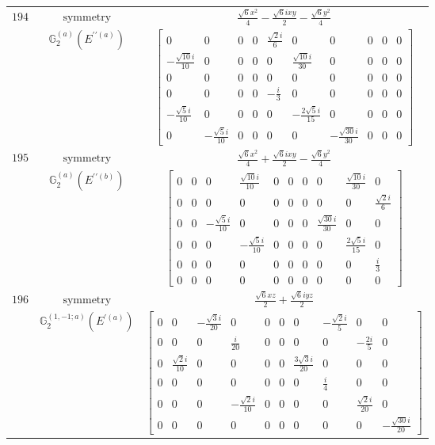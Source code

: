 \documentclass[fleqn,8pt,landscape]{jsarticle}
\begin{document}
\begin{longtable}{ccc}
$ 194 $ & $ \text{symmetry} $ & $ \frac{\sqrt{6} x^{2}}{4} - \frac{\sqrt{6} i x y}{2} - \frac{\sqrt{6} y^{2}}{4} $ \\
$  $ & $ \mathbb{G}_{2}^{(a)}(E^{\prime\prime(a)}) $ & $ \begin{bmatrix} 0 & 0 & 0 & 0 & \frac{\sqrt{2} i}{6} & 0 & 0 & 0 & 0 & 0 \\ - \frac{\sqrt{10} i}{10} & 0 & 0 & 0 & 0 & \frac{\sqrt{10} i}{30} & 0 & 0 & 0 & 0 \\ 0 & 0 & 0 & 0 & 0 & 0 & 0 & 0 & 0 & 0 \\ 0 & 0 & 0 & 0 & - \frac{i}{3} & 0 & 0 & 0 & 0 & 0 \\ - \frac{\sqrt{5} i}{10} & 0 & 0 & 0 & 0 & - \frac{2 \sqrt{5} i}{15} & 0 & 0 & 0 & 0 \\ 0 & - \frac{\sqrt{5} i}{10} & 0 & 0 & 0 & 0 & - \frac{\sqrt{30} i}{30} & 0 & 0 & 0 \end{bmatrix} $ \\ \hline
$ 195 $ & $ \text{symmetry} $ & $ \frac{\sqrt{6} x^{2}}{4} + \frac{\sqrt{6} i x y}{2} - \frac{\sqrt{6} y^{2}}{4} $ \\
$  $ & $ \mathbb{G}_{2}^{(a)}(E^{\prime\prime(b)}) $ & $ \begin{bmatrix} 0 & 0 & 0 & \frac{\sqrt{10} i}{10} & 0 & 0 & 0 & 0 & \frac{\sqrt{10} i}{30} & 0 \\ 0 & 0 & 0 & 0 & 0 & 0 & 0 & 0 & 0 & \frac{\sqrt{2} i}{6} \\ 0 & 0 & - \frac{\sqrt{5} i}{10} & 0 & 0 & 0 & 0 & \frac{\sqrt{30} i}{30} & 0 & 0 \\ 0 & 0 & 0 & - \frac{\sqrt{5} i}{10} & 0 & 0 & 0 & 0 & \frac{2 \sqrt{5} i}{15} & 0 \\ 0 & 0 & 0 & 0 & 0 & 0 & 0 & 0 & 0 & \frac{i}{3} \\ 0 & 0 & 0 & 0 & 0 & 0 & 0 & 0 & 0 & 0 \end{bmatrix} $ \\ \hline
$ 196 $ & $ \text{symmetry} $ & $ \frac{\sqrt{6} x z}{2} + \frac{\sqrt{6} i y z}{2} $ \\
$  $ & $ \mathbb{G}_{2}^{(1,-1;a)}(E^{\prime(a)}) $ & $ \begin{bmatrix} 0 & 0 & - \frac{\sqrt{3} i}{20} & 0 & 0 & 0 & 0 & - \frac{\sqrt{2} i}{5} & 0 & 0 \\ 0 & 0 & 0 & \frac{i}{20} & 0 & 0 & 0 & 0 & - \frac{2 i}{5} & 0 \\ 0 & \frac{\sqrt{2} i}{10} & 0 & 0 & 0 & 0 & \frac{3 \sqrt{3} i}{20} & 0 & 0 & 0 \\ 0 & 0 & 0 & 0 & 0 & 0 & 0 & \frac{i}{4} & 0 & 0 \\ 0 & 0 & 0 & - \frac{\sqrt{2} i}{10} & 0 & 0 & 0 & 0 & \frac{\sqrt{2} i}{20} & 0 \\ 0 & 0 & 0 & 0 & 0 & 0 & 0 & 0 & 0 & - \frac{\sqrt{30} i}{20} \end{bmatrix} $ \\ \hline

\end{longtable}
\end{document}
